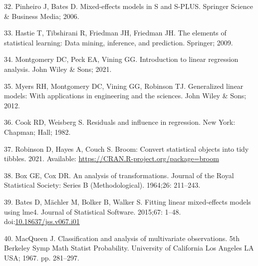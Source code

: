 \documentclass[10pt,letterpaper]{article}
\begin{document}
\leavevmode\hypertarget{ref-pinheiro2006mixed}{}%
32. Pinheiro J, Bates D. Mixed-effects models in S and S-PLUS. Springer
Science \& Business Media; 2006.

\leavevmode\hypertarget{ref-hastie2009elements}{}%
33. Hastie T, Tibshirani R, Friedman JH, Friedman JH. The elements of
statistical learning: Data mining, inference, and prediction. Springer;
2009.

\leavevmode\hypertarget{ref-montgomery2021introduction}{}%
34. Montgomery DC, Peck EA, Vining GG. Introduction to linear regression
analysis. John Wiley \& Sons; 2021.

\leavevmode\hypertarget{ref-myers2012generalized}{}%
35. Myers RH, Montgomery DC, Vining GG, Robinson TJ. Generalized linear
models: With applications in engineering and the sciences. John Wiley \&
Sons; 2012.

\leavevmode\hypertarget{ref-cook1982residuals}{}%
36. Cook RD, Weisberg S. Residuals and influence in regression. New
York: Chapman; Hall; 1982.

\leavevmode\hypertarget{ref-robinson2021broom}{}%
37. Robinson D, Hayes A, Couch S. Broom: Convert statistical objects
into tidy tibbles. 2021. Available:
\url{https://CRAN.R-project.org/package=broom}

\leavevmode\hypertarget{ref-box1964analysis}{}%
38. Box GE, Cox DR. An analysis of transformations. Journal of the Royal
Statistical Society: Series B (Methodological). 1964;26: 211--243.

\leavevmode\hypertarget{ref-bates2015lme4}{}%
39. Bates D, Mächler M, Bolker B, Walker S. Fitting linear mixed-effects
models using lme4. Journal of Statistical Software. 2015;67: 1--48.
doi:\href{https://doi.org/10.18637/jss.v067.i01}{10.18637/jss.v067.i01}

\leavevmode\hypertarget{ref-macqueen1967classification}{}%
40. MacQueen J. Classification and analysis of multivariate
observations. 5th Berkeley Symp Math Statist Probability. University of
California Los Angeles LA USA; 1967. pp. 281--297.

\nolinenumbers
\end{document}
